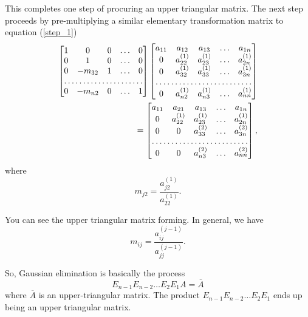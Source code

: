 \documentclass[a4paper]{article}
\begin{document}
This completes one step of procuring an upper triangular matrix. The
next step proceeds by pre-multiplying a similar elementary transformation
matrix to equation (\ref{step_1})
\begin{equation}
	\label{step_2}
	\begin{split}
		\begin{bmatrix} 
	1 & 0 & 0 & \ldots & 0\\
0 & 1 & 0 & \ldots & 0\\
0 & -m_{32} & 1 & \ldots & 0\\
\hdotsfor{5}\\
0 & -m_{n 2} & 0 & \ldots & 1
\end{bmatrix}
\begin{bmatrix}  
	a_{11} & a_{12} & a_{13} & \ldots & a_{1 n} \\
	0 & a_{22}^{(1)} & a_{23}^{(1)} & \ldots & a_{2 n}^{(1)}\\
	0 & a_{32}^{(1)} & a_{33}^{(1)} & \ldots & a_{3 n}^{(1)}\\
	\hdotsfor{5}\\
	0 & a_{n 2}^{(1)} & a_{n 3}^{(1)} & \ldots & a_{n n}^{(1)} 
\end{bmatrix} 	\\
= \begin{bmatrix} 
	a_{11} & a_{21} & a_{13} & \ldots & a_{1 n} \\
0 & a_{22}^{(1)} & a_{23}^{(1)} & \ldots & a_{2n}^{(1)}\\
0 & 0 & a_{33}^{(2)} & \ldots & a_{3 n}^{(2)}\\
\hdotsfor{5}\\
0 & 0 & a_{n 3}^{(2)} & \ldots & a_{n n}^{(2)}\end{bmatrix} ,
	\end{split}
\end{equation}
where
\begin{equation}
	m_{j 2} = \frac{a_{j2}^{(1)}}{a_{2 2}^{(1)}}.
\end{equation}

You can see the upper triangular matrix forming. In general, we
have 
\begin{equation}
	\label{mij}
	m_{ij} = \frac{a_{ij}^{(j-1)}}{a_{jj}^{(j-1)}}.
\end{equation}

So, Gaussian elimination is basically the process
\begin{equation}
	E_{n-1}E_{n-2}\ldots E_2E_1A = \overline{A}
\end{equation}
where $\overline{A}$ is an upper-triangular matrix. The product
$E_{n -1}E_{n-2}\ldots E_2E_1$ ends up being an upper triangular matrix.
\end{document}
